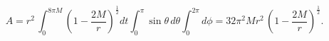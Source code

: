 \begin{equation}
A=r^2\,\int_{0}^{8\pi M}\left(1-\frac{2M}{r}\right)^{\frac{1}{2}} dt
\int_{0}^{\pi }\sin\theta \,d\theta \int_{0}^{2\pi}d\phi=32 \pi^2 M
r^2\,\left(1-\frac{2M}{r}\right)^{\frac{1}{2}}.
\end{equation}

